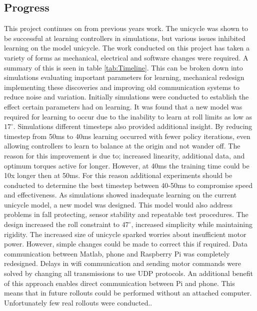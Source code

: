 \documentclass[twoside,twocolumn,12pt]{article}
\begin{document}
\twocolumn
{}%


\subsection{Progress}
This project continues on from previous years work. The unicycle was shown to be successful at learning controllers in simulations, but various issues inhibited learning on the model unicycle.   
\newline
The work conducted on this project has taken a variety of forms as mechanical, electrical and software changes were required. A summary of this is seen in table \ref{tab:Timeline}. This can be broken down into simulations evaluating important parameters for learning, mechanical redesign implementing these discoveries and improving old communication systems to reduce noise and variation.
\newline
Initially simulations were conducted to establish the effect certain parameters had on learning. It was found that a new model was required for learning to occur due to the inability to learn at roll limits as low as $17^{\circ}$. Simulations different timesteps also provided additional insight. By reducing timestep from 50ms to 40ms learning occurred with fewer policy iterations, even allowing controllers to learn to balance at the origin and not wander off. The reason for this improvement is due to; increased linearity, additional data, and optimum torques active for longer. However, at 40ms the training time could be 10x longer then at 50ms. For this reason additional experiments should be conducted to determine the best timestep between 40-50ms to compromise speed and effectiveness. 
\newline
As simulations showed inadequate learning on the current unicycle model, a new model was designed. This model would also address problems in fall protecting, sensor stability and repeatable test procedures. The design increased the roll constraint to $47^{\circ}$, increased simplicity while maintaining rigidity. The increased size of unicycle sparked worries about insufficient motor power. However, simple changes could be made to correct this if required.   
\newline
Data communication between Matlab, phone and Raspberry Pi was completely redesigned. Delays in wifi communication and sending motor commands were solved by changing all transmissions to use UDP protocols. An additional benefit of this approach enables direct communication between Pi and phone. This means that in future rollouts could be performed without an attached computer.
\newline
Unfortunately few real rollouts were conducted..
\end{document}
